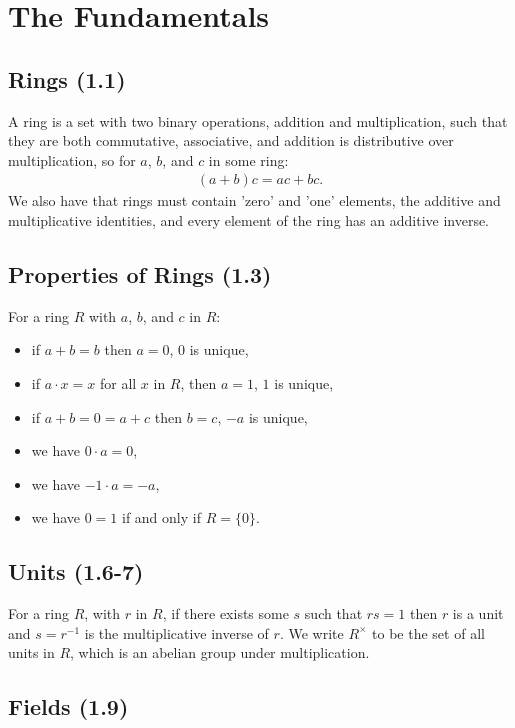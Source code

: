 \section{The Fundamentals}

\subsection{Rings (1.1)} \label{1.1}

A ring is a set with two binary operations, addition and multiplication,
such that they are both commutative, associative, and addition is distributive over
multiplication, so for $a$, $b$, and $c$ in some ring: \begin{align*}
    (a + b)c = ac + bc.
\end{align*} We also have that rings must contain 'zero' and 'one' elements, the additive and
multiplicative identities, and every element of the ring has an additive inverse.

\subsection{Properties of Rings (1.3)} \label{1.3}

For a ring $R$ with $a$, $b$, and $c$ in $R$: \begin{itemize}
    \item if $a + b = b$ then $a = 0$, $0$ is unique,
    \item if $a \cdot x = x$ for all $x$ in $R$, then $a = 1$, $1$ is unique,
    \item if $a + b = 0 = a + c$ then $b = c$, $-a$ is unique, 
    \item we have $0 \cdot a = 0$,
    \item we have $-1 \cdot a = -a$,
    \item we have $0 = 1$ if and only if $R = \{0\}$.
\end{itemize}

\subsection{Units (1.6-7)} \label{1.6} \label{1.7}

For a ring $R$, with $r$ in $R$, if there exists some $s$ such that $rs = 1$ then $r$
is a unit and $s = r^{-1}$ is the multiplicative inverse of $r$. We write $R^\times$ to
be the set of all units in $R$, which is an abelian group under multiplication.

\subsection{Fields (1.9)} \label{1.9}

